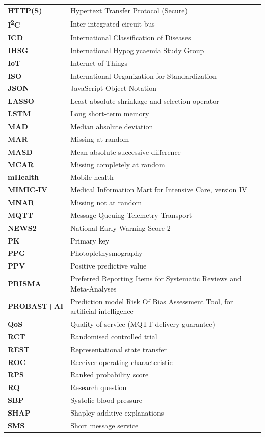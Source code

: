 {\begin{longtable}{@{}>{\bfseries}p{3.0cm} p{11.6cm}@{}}
HTTP(S) & Hypertext Transfer Protocol (Secure) \\
I\textsuperscript{2}C & Inter-integrated circuit bus \\
ICD & International Classification of Diseases \\
IHSG & International Hypoglycaemia Study Group \\
IoT & Internet of Things \\
ISO & International Organization for Standardization \\
JSON & JavaScript Object Notation \\
LASSO & Least absolute shrinkage and selection operator \\
LSTM & Long short-term memory \\
MAD & Median absolute deviation \\
MAR & Missing at random \\
MASD & Mean absolute successive difference \\
MCAR & Missing completely at random \\
mHealth & Mobile health \\
MIMIC-IV & Medical Information Mart for Intensive Care, version IV \\
MNAR & Missing not at random \\
MQTT & Message Queuing Telemetry Transport \\
NEWS2 & National Early Warning Score 2 \\
PK & Primary key \\
PPG & Photoplethysmography \\
PPV & Positive predictive value \\
PRISMA & Preferred Reporting Items for Systematic Reviews and Meta-Analyses \\
PROBAST+AI & Prediction model Risk Of Bias Assessment Tool, for artificial intelligence \\
QoS & Quality of service (MQTT delivery guarantee) \\
RCT & Randomised controlled trial \\
REST & Representational state transfer \\
ROC & Receiver operating characteristic \\
RPS & Ranked probability score \\
RQ & Research question \\
SBP & Systolic blood pressure \\
SHAP & Shapley additive explanations \\
SMS & Short message service \\

\end{longtable}}

